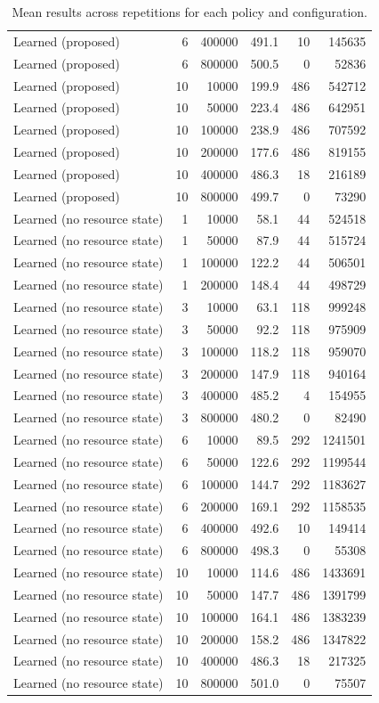 \begin{table}[h]
\begin{tabular}{@{}lrrrrr@{}}
Learned (proposed) & 6 & 400000 & 491.1 & 10 & 145635 \\
Learned (proposed) & 6 & 800000 & 500.5 & 0 & 52836 \\
Learned (proposed) & 10 & 10000 & 199.9 & 486 & 542712 \\
Learned (proposed) & 10 & 50000 & 223.4 & 486 & 642951 \\
Learned (proposed) & 10 & 100000 & 238.9 & 486 & 707592 \\
Learned (proposed) & 10 & 200000 & 177.6 & 486 & 819155 \\
Learned (proposed) & 10 & 400000 & 486.3 & 18 & 216189 \\
Learned (proposed) & 10 & 800000 & 499.7 & 0 & 73290 \\
Learned (no resource state) & 1 & 10000 & 58.1 & 44 & 524518 \\
Learned (no resource state) & 1 & 50000 & 87.9 & 44 & 515724 \\
Learned (no resource state) & 1 & 100000 & 122.2 & 44 & 506501 \\
Learned (no resource state) & 1 & 200000 & 148.4 & 44 & 498729 \\
Learned (no resource state) & 3 & 10000 & 63.1 & 118 & 999248 \\
Learned (no resource state) & 3 & 50000 & 92.2 & 118 & 975909 \\
Learned (no resource state) & 3 & 100000 & 118.2 & 118 & 959070 \\
Learned (no resource state) & 3 & 200000 & 147.9 & 118 & 940164 \\
Learned (no resource state) & 3 & 400000 & 485.2 & 4 & 154955 \\
Learned (no resource state) & 3 & 800000 & 480.2 & 0 & 82490 \\
Learned (no resource state) & 6 & 10000 & 89.5 & 292 & 1241501 \\
Learned (no resource state) & 6 & 50000 & 122.6 & 292 & 1199544 \\
Learned (no resource state) & 6 & 100000 & 144.7 & 292 & 1183627 \\
Learned (no resource state) & 6 & 200000 & 169.1 & 292 & 1158535 \\
Learned (no resource state) & 6 & 400000 & 492.6 & 10 & 149414 \\
Learned (no resource state) & 6 & 800000 & 498.3 & 0 & 55308 \\
Learned (no resource state) & 10 & 10000 & 114.6 & 486 & 1433691 \\
Learned (no resource state) & 10 & 50000 & 147.7 & 486 & 1391799 \\
Learned (no resource state) & 10 & 100000 & 164.1 & 486 & 1383239 \\
Learned (no resource state) & 10 & 200000 & 158.2 & 486 & 1347822 \\
Learned (no resource state) & 10 & 400000 & 486.3 & 18 & 217325 \\
Learned (no resource state) & 10 & 800000 & 501.0 & 0 & 75507 \\
\bottomrule
\end{tabular}
\caption{Mean results across repetitions for each policy and configuration.}
\label{tab:results}
\end{table}

